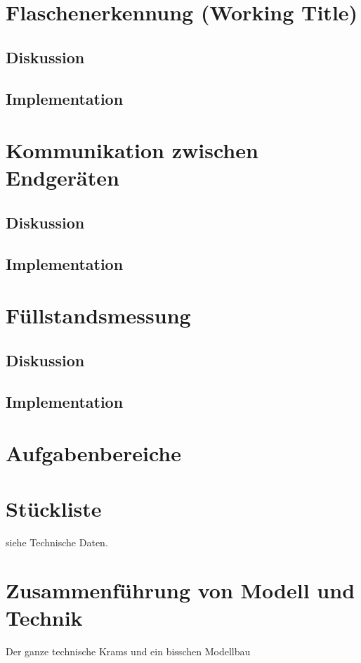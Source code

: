 \section{Flaschenerkennung (Working Title)}
    \subsection{Diskussion}

    \subsection{Implementation}

\section{Kommunikation zwischen Endgeräten}
    \subsection{Diskussion}

    \subsection{Implementation}

\section{Füllstandsmessung}
    \subsection{Diskussion}

    \subsection{Implementation} 

    \section{Aufgabenbereiche}


\section{Stückliste}
    siehe Technische Daten.

\section{Zusammenführung von Modell und Technik}
    Der ganze technische Krams und ein bisschen Modellbau
